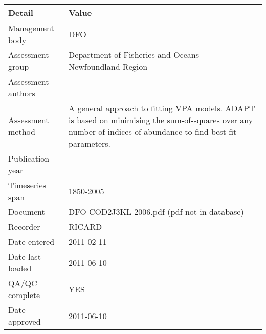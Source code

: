 \begin{table}[htb]
\centering
\begin{tabular}{lp{7cm}}
\toprule
Detail & Value \\
\midrule
Management body    & DFO                                                                                                                                                            \\
Assessment group   & Department of Fisheries and Oceans - Newfoundland Region                                                                                                       \\
Assessment authors &                                                                                                                                                                \\
Assessment method  & A general approach to fitting VPA models. ADAPT is based on minimising the sum-of-squares over any number of indices of abundance to find best-fit parameters. \\
Publication year   &                                                                                                                                                                \\
Timeseries span    & 1850-2005                                                                                                                                                      \\
Document           & DFO-COD2J3KL-2006.pdf (pdf not in database)                                                                                                                    \\
Recorder           & RICARD                                                                                                                                                         \\
Date entered       & 2011-02-11                                                                                                                                                     \\
Date last loaded   & 2011-06-10                                                                                                                                                     \\
QA/QC complete     & YES                                                                                                                                                            \\
Date approved      & 2011-06-10                                                                                                                                                     \\
\bottomrule
\end{tabular}
\label{tab:assessdet}
\end{table}
